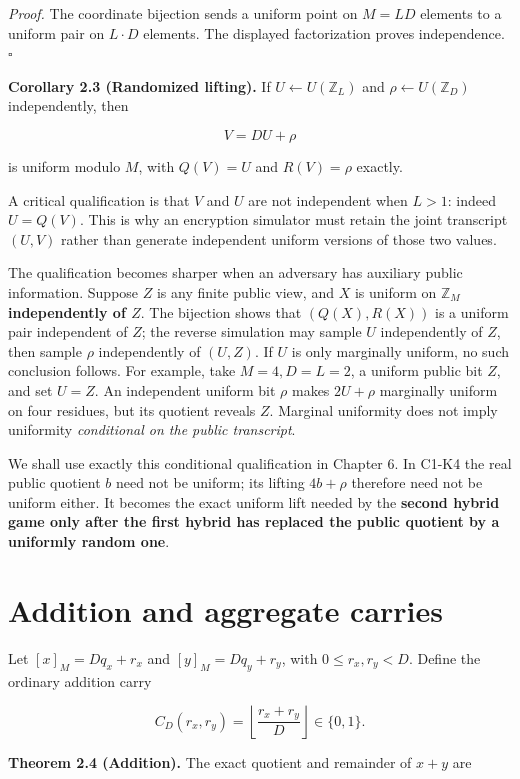 \documentclass[
  11pt,
  a4paper,
  oneside]{report}
\begin{document}
\emph{Proof.} The coordinate bijection sends a uniform point on \(M=LD\)
elements to a uniform pair on \(L\cdot D\) elements. The displayed
factorization proves independence. \(\square\)

\textbf{Corollary 2.3 (Randomized lifting).} If
\(U\leftarrow U(\mathbb Z_L)\) and \(\rho\leftarrow U(\mathbb Z_D)\)
independently, then

\[
V=DU+\rho
\]

is uniform modulo \(M\), with \(Q(V)=U\) and \(R(V)=\rho\) exactly.

A critical qualification is that \(V\) and \(U\) are not independent
when \(L>1\): indeed \(U=Q(V)\). This is why an encryption simulator
must retain the joint transcript \((U,V)\) rather than generate
independent uniform versions of those two values.

The qualification becomes sharper when an adversary has auxiliary public
information. Suppose \(Z\) is any finite public view, and \(X\) is
uniform on \(\mathbb Z_M\) \textbf{independently of \(Z\)}. The
bijection shows that \((Q(X),R(X))\) is a uniform pair independent of
\(Z\); the reverse simulation may sample \(U\) independently of \(Z\),
then sample \(\rho\) independently of \((U,Z)\). If \(U\) is only
marginally uniform, no such conclusion follows. For example, take
\(M=4,D=L=2\), a uniform public bit \(Z\), and set \(U=Z\). An
independent uniform bit \(\rho\) makes \(2U+\rho\) marginally uniform on
four residues, but its quotient reveals \(Z\). Marginal uniformity does
not imply uniformity \emph{conditional on the public transcript}.

We shall use exactly this conditional qualification in Chapter 6. In
C1-K4 the real public quotient \(b\) need not be uniform; its lifting
\(4b+\rho\) therefore need not be uniform either. It becomes the exact
uniform lift needed by the \textbf{second hybrid game only after the
first hybrid has replaced the public quotient by a uniformly random
one}.

\section{Addition and aggregate
carries}\label{addition-and-aggregate-carries}

Let \([x]_M=Dq_x+r_x\) and \([y]_M=Dq_y+r_y\), with \(0\le r_x,r_y<D\).
Define the ordinary addition carry

\[
C_D(r_x,r_y)=\left\lfloor\frac{r_x+r_y}{D}\right\rfloor\in\{0,1\}.
\]

\textbf{Theorem 2.4 (Addition).} The exact quotient and remainder of
\(x+y\) are
\end{document}

